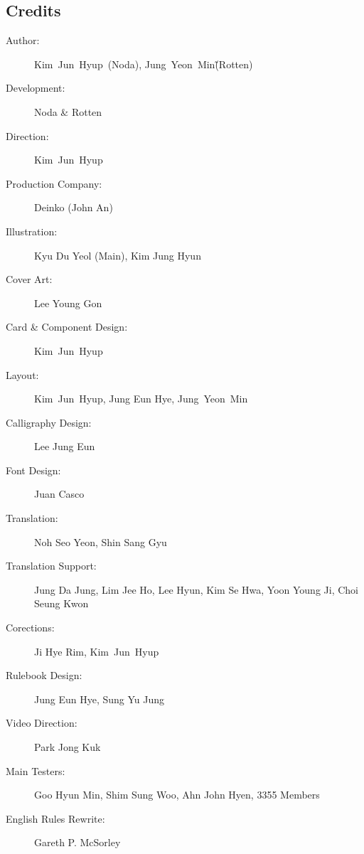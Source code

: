 \documentclass[10pt,twocolumn]{article}
\begin{document}
\begin{appendices}
\section*{Credits}
\newcommand\noda{Kim~Jun~Hyup}
\newcommand\rotten{Jung~Yeon~Min}
\begin{description}
\item[Author:] \noda\ (Noda), \rotten\~(Rotten)
\item[Development:] Noda \& Rotten
\item[Direction:] \noda
\item[Production Company:] Deinko (John An)
\item[Illustration:] Kyu Du Yeol (Main), Kim Jung Hyun
\item[Cover Art:] Lee Young Gon
\item[Card \& Component Design:] \noda
\item[Layout:] \noda, Jung Eun Hye, \rotten
\item[Calligraphy Design:] Lee Jung Eun
\item[Font Design:] Juan Casco
\item[Translation:] Noh Seo Yeon, Shin Sang Gyu
\item[Translation Support:] Jung Da Jung, Lim Jee Ho, Lee Hyun, Kim Se Hwa, Yoon Young Ji, Choi Seung Kwon
\item[Corections:] Ji Hye Rim, \noda
\item[Rulebook Design:] Jung Eun Hye, Sung Yu Jung
\item[Video Direction:] Park Jong Kuk
\item[Main Testers:] Goo Hyun Min, Shim Sung Woo, Ahn John Hyen, 3355 Members
\item[English Rules Rewrite:] Gareth P. McSorley
\end{description}
\end{appendices}
\end{document}
